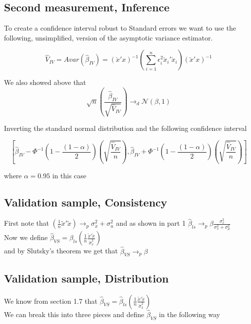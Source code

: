 \documentclass[11pt]{article}
\newcommand{\plim}{\rightarrow_{p}}
\begin{document}
\subsection{Second measurement, Inference}
To create a confidence interval robust to Standard errors we want to use the following, unsimplified, version of the asymptotic variance estimator. 

$$\hat{V}_{IV} = Avar(\hat{\beta}_{IV}) = (\check{x}'x)^{-1}\left( \sum_{i=1}^{n}\epsilon_{i}^2 \check{x}_i' \check{x}_i \right) (\check{x}'x)^{-1}$$

We also showed above that 
$$
\sqrt{n}(\frac{\hat{\beta}_{IV}}{\sqrt{\hat{V}_{IV} }}) \to_d \mathcal{N}(\beta,1)
$$


Inverting the standard normal distribution and the following confidence interval 

$$ \left[ \hat{\beta}_{IV} - \Phi^{-1} \left( 1 -\frac{(1-\alpha)}{2} \right) \left( \sqrt{\frac{\hat{V}_{IV} }{n}} \right),  \hat{\beta}_{IV} + \Phi^{-1} \left( 1 -\frac{(1-\alpha)}{2} \right) \left( \sqrt{\frac{\hat{V}_{IV} }{n}} \right) \right] $$

where $\alpha = 0.95$ in this case 

\subsection{Validation sample, Consistency}

First note that $(\frac{1}{n}\tilde{x}'\tilde{x}) \plim \sigma_x^2 + \sigma_u^2$ and as shown in part 1 $\hat{\beta}_{ls} \plim \beta \frac{\sigma_{x}^2}{\sigma_{x}^2 + \sigma_{\mu}^2}$\\

Now we define $\hat{\beta}_{VS} = \hat{\beta}_{ls}\left(\frac{1}{n}\frac{\tilde{x}'\tilde{x}}{\check{\sigma}_x^2} \right)$ \\

and by Slutsky's theorem we get that $\hat{\beta}_{VS} \plim \beta$

\subsection{Validation sample, Distribution}

We know from section 1.7 that  $\hat{\beta}_{VS} = \hat{\beta}_{ls}\left(\frac{1}{n}\frac{\tilde{x}'\tilde{x}}{\check{\sigma}_x^2} \right)$ \\

We can break this into three pieces and define $\hat{\beta}_{VS}$ in the following way 
\end{document}

